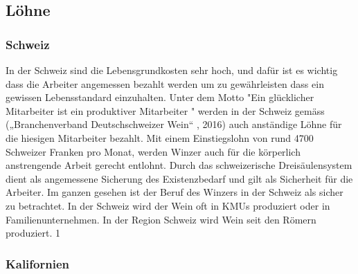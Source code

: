 \subsection{Löhne}
\subsubsection{Schweiz}
In der Schweiz sind die Lebensgrundkosten sehr hoch, und dafür ist es wichtig dass die Arbeiter angemessen bezahlt werden um zu gewährleisten dass ein gewissen Lebensstandard einzuhalten. Unter dem Motto "Ein glücklicher Mitarbeiter ist ein produktiver Mitarbeiter " werden in der Schweiz gemäss
(„Branchenverband Deutschschweizer Wein“ , 2016) auch anständige Löhne für die hiesigen Mitarbeiter bezahlt. Mit einem Einstiegslohn von rund 4700 Schweizer Franken pro Monat, werden Winzer auch für die körperlich anstrengende Arbeit gerecht entlohnt. Durch das schweizerische Dreisäulensystem dient als angemessene Sicherung des Existenzbedarf und gilt als Sicherheit für die Arbeiter. Im ganzen gesehen ist der Beruf des Winzers in der Schweiz als sicher zu betrachtet. In der Schweiz wird der Wein oft in KMUs produziert oder in Familienunternehmen. In der Region Schweiz wird Wein seit den Römern produziert. 1

\subsubsection{Kalifornien}

